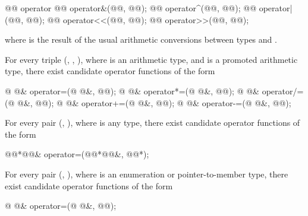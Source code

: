\begin{codeblock}
@@      operator%
@@      operator&(@@, @@);
@@      operator^(@@, @@);
@@      operator|(@@, @@);
@@       operator<<(@@, @@);
@@       operator>>(@@, @@);
\end{codeblock}

where
is the result of the usual arithmetic conversions between types
and
.

\pnum
For every triple
(,
,
),
where
is an arithmetic type,
and
is a promoted arithmetic type,
there exist candidate operator functions of the form

\begin{codeblock}
@ @&   operator=(@ @&, @@);
@ @&   operator*=(@ @&, @@);
@ @&   operator/=(@ @&, @@);
@ @&   operator+=(@ @&, @@);
@ @&   operator-=(@ @&, @@);
\end{codeblock}

\pnum
For every pair (, ),
where  is any type,
there exist candidate operator functions of the form

\begin{codeblock}
@@*@@&   operator=(@@*@@&, @@*);
\end{codeblock}

\pnum
For every pair
(,
),
where
is an enumeration or pointer-to-member type,
there exist candidate operator functions of the form

\begin{codeblock}
@ @&   operator=(@ @&, @@);
\end{codeblock}

